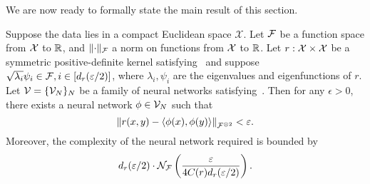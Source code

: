 We are now ready to formally state the main result of this section.

\begin{theorem}\label{theorem:symmetric_inner_prod_rels_func_class}
	Suppose the data lies in a compact Euclidean space $\mathcal{X}$. Let ${\mathcal{F}}$ be a function space from ${\mathcal{X}}$ to $\mathbb{R}$, and $\lVert\cdot\rVert_{\mathcal{F}}$ a norm on functions from  ${\mathcal{X}}$ to $\mathbb{R}$.
	Let $r: {\mathcal{X}} \times {\mathcal{X}}$ be a symmetric positive-definite kernel satisfying~ and suppose $\sqrt{\lambda_i} \psi_i \in {\mathcal{F}}, i \in [d_r(\varepsilon / 2)]$, where $\lambda_i, \psi_i$ are the eigenvalues and eigenfunctions of $r$.
	Let ${\mathcal{V}} = \{{\mathcal{V}}_N\}_N$ be a family of neural networks satisfying~.
	Then for any $\epsilon > 0$, there exists a neural network $\phi \in {\mathcal{V}}_N$ such that 
	\[\left\lVert r(x,y) - \left \langle \phi(x), \phi(y) \right\rangle\right\rVert_{{\mathcal{F}}^{\otimes 2}} < \varepsilon.\]
	Moreover, the complexity of the neural network required is bounded by
	\[d_r(\varepsilon/2) \cdot {\mathcal{N}}_{\mathcal{F}}\left(\frac{\varepsilon}{4 C(r) d_r(\varepsilon/2)}\right).\]
\end{theorem}


